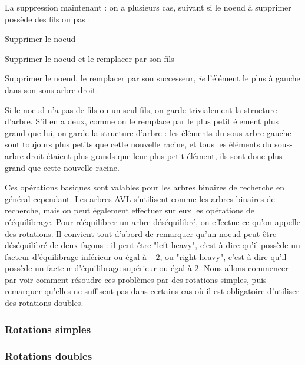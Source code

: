 \documentclass{article}
\begin{document}
La suppression maintenant : on a plusieurs cas, suivant si le noeud à supprimer possède des fils ou pas :

\begin{algorithmic}

Supprimer le noeud


Supprimer le noeud et le remplacer par son fils

\Else

Supprimer le noeud, le remplacer par son successeur, \textit{ie} l'élément le plus à gauche dans son sous-arbre droit.
\EndIf
\end{algorithmic}
Si le noeud n'a pas de fils ou un seul fils, on garde trivialement la structure d'arbre. S'il en a deux, comme on le remplace par le plus petit élement plus grand que lui, on garde la structure d'arbre : les éléments du sous-arbre gauche sont toujours plus petits que cette nouvelle racine, et tous les éléments du sous-arbre droit étaient plus grands que leur plus petit élément, ils sont donc plus grand que cette nouvelle racine.

Ces opérations basiques sont valables pour les arbres binaires de recherche en général cependant. Les arbres AVL s'utilisent comme les arbres binaires de recherche, mais on peut également effectuer sur eux les opérations de rééquilibrage. Pour rééquilibrer 
un arbre déséquilibré, on effectue ce qu'on appelle des rotations. Il convient tout d'abord de remarquer qu'un noeud peut être déséquilibré de deux façons : il peut 
être "left heavy", c'est-à-dire qu'il possède un facteur d'équilibrage inférieur ou égal à $-2$, ou "right heavy", c'est-à-dire qu'il possède un facteur 
d'équilibrage supérieur ou égal à $2$. Nous allons commencer par voir comment résoudre ces problèmes par des rotations simples, puis remarquer qu'elles ne suffisent pas 
dans certains cas où il est obligatoire d'utiliser des rotations doubles.

\subsubsection{Rotations simples}


\subsubsection{Rotations doubles}
\end{document}
